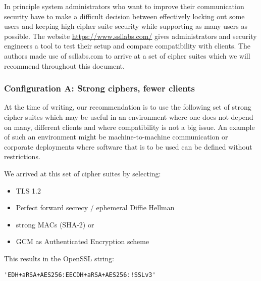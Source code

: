 
In principle system administrators who want to improve their communication security
have to make a difficult decision between effectively locking out some users and 
keeping high cipher suite security while supporting as many users as possible.
The website \url{https://www.ssllabs.com/} gives administrators and security engineers
a tool to test their setup and compare compatibility with clients. The authors made 
use of ssllabs.com to arrive at a set of cipher suites which we will recommend 
throughout this document.\\



\subsubsection{Configuration A: Strong ciphers, fewer clients}

At the time of writing, our recommendation is to use the following set of strong cipher
suites which may be useful in an environment where one does not depend on many,
different clients and where compatibility is not a big issue.  An example
of such an environment might be machine-to-machine communication or corporate
deployments where software that is to be used can be defined without restrictions.


We arrived at this set of cipher suites by selecting:

\begin{itemize}
\item TLS 1.2
\item Perfect forward secrecy / ephemeral Diffie Hellman
\item strong MACs (SHA-2) or
\item GCM as Authenticated Encryption scheme
\end{itemize}

This results in the OpenSSL string:

\begin{lstlisting}
'EDH+aRSA+AES256:EECDH+aRSA+AES256:!SSLv3'
\end{lstlisting}

